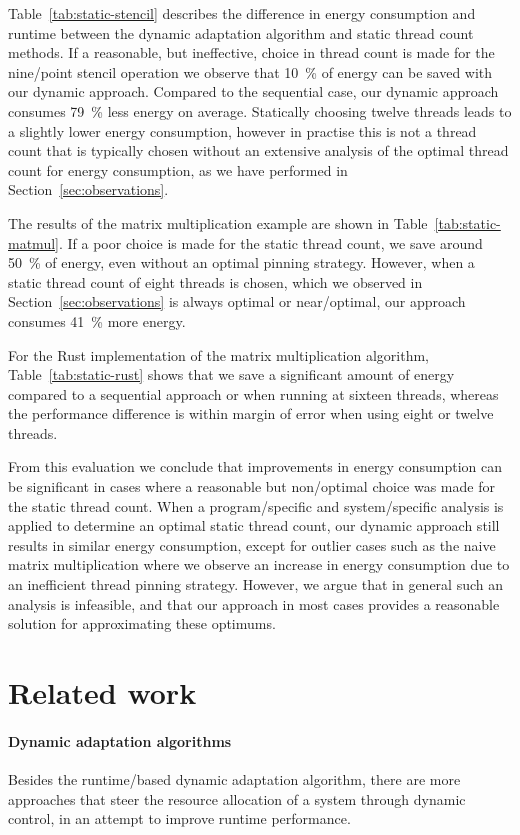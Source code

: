 Table~\ref{tab:static-stencil} describes the difference in energy consumption and runtime between the dynamic adaptation algorithm and static thread count methods.
If a reasonable, but ineffective, choice in thread count is made for the nine\-/point stencil operation we observe that \qty{10}{\percent} of energy can be saved with our dynamic approach.
Compared to the sequential case, our dynamic approach consumes \qty{79}{\percent} less energy on average.
Statically choosing twelve threads leads to a slightly lower energy consumption, however in practise this is not a thread count that is typically chosen without an extensive analysis of the optimal thread count for energy consumption, as we have performed in Section~\ref{sec:observations}.

The results of the matrix multiplication example are shown in Table~\ref{tab:static-matmul}.
If a poor choice is made for the static thread count, we save around \qty{50}{\percent} of energy, even without an optimal pinning strategy.
However, when a static thread count of eight threads is chosen, which we observed in Section~\ref{sec:observations} is always optimal or near\-/optimal, our approach consumes \qty{41}{\percent} more energy.

For the Rust implementation of the matrix multiplication algorithm, Table~\ref{tab:static-rust} shows that we save a significant amount of energy compared to a sequential approach or when running at sixteen threads, whereas the performance difference is within margin of error when using eight or twelve threads.

From this evaluation we conclude that improvements in energy consumption can be significant in cases where a reasonable but non\-/optimal choice was made for the static thread count.
When a program\-/specific and system\-/specific analysis is applied to determine an optimal static thread count, our dynamic approach still results in similar energy consumption, except for outlier cases such as the naive matrix multiplication where we observe an increase in energy consumption due to an inefficient thread pinning strategy.
However, we argue that in general such an analysis is infeasible, and that our approach in most cases provides a reasonable solution for approximating these optimums.

\section{Related work}
\paragraph{Dynamic adaptation algorithms}
Besides the runtime\-/based dynamic adaptation algorithm\cite{gordon2015dynamic}, there are more approaches that steer the resource allocation of a system through dynamic control, in an attempt to improve runtime performance.

